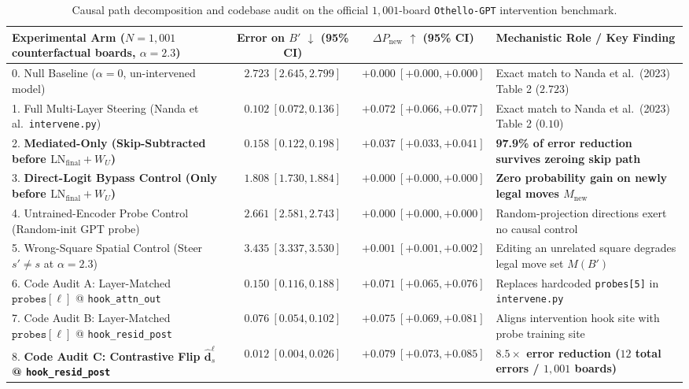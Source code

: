 \documentclass{article}
\begin{document}
\begin{table}[h!]
\caption{\label{tab:main_results}
Causal path decomposition and codebase audit on the official $1{,}001$-board \texttt{Othello-GPT} intervention benchmark.}
\centering
\scriptsize
\setlength{\tabcolsep}{4.0pt}
\renewcommand{\arraystretch}{1.02}
\begin{tabularx}{\textwidth}{@{}l cc X@{}}
\toprule
\textbf{Experimental Arm ($N = 1{,}001$ counterfactual boards, $\alpha = 2.3$)} & \textbf{Error on $B'$ $\downarrow$ (95\% CI)} & \textbf{$\Delta P_{\text{new}}$ $\uparrow$ (95\% CI)} & \textbf{Mechanistic Role / Key Finding} \\
\midrule
0. Null Baseline ($\alpha = 0$, un-intervened model) & $2.723\ [2.645, 2.799]$ & $+0.000\ [+0.000, +0.000]$ & Exact match to Nanda et al.\ (2023) Table 2 ($2.723$) \\
1. Full Multi-Layer Steering (Nanda et al.\ \texttt{intervene.py}) & $0.102\ [0.072, 0.136]$ & $+0.072\ [+0.066, +0.077]$ & Exact match to Nanda et al.\ (2023) Table 2 ($0.10$) \\
2. \textbf{Mediated-Only (Skip-Subtracted before $\text{LN}_{\text{final}} + W_U$)} & $\mathbf{0.158}\ [0.122, 0.198]$ & $\mathbf{+0.037}\ [+0.033, +0.041]$ & \textbf{97.9\% of error reduction survives zeroing skip path} \\
3. \textbf{Direct-Logit Bypass Control (Only before $\text{LN}_{\text{final}} + W_U$)} & $1.808\ [1.730, 1.884]$ & $\mathbf{+0.000}\ [+0.000, +0.000]$ & \textbf{Zero probability gain on newly legal moves $M_{\text{new}}$} \\
4. Untrained-Encoder Probe Control (Random-init GPT probe) & $2.661\ [2.581, 2.743]$ & $+0.000\ [+0.000, +0.000]$ & Random-projection directions exert no causal control \\
5. Wrong-Square Spatial Control (Steer $s' \neq s$ at $\alpha = 2.3$) & $3.435\ [3.337, 3.530]$ & $+0.001\ [+0.001, +0.002]$ & Editing an unrelated square degrades legal move set $M(B')$ \\
\midrule
6. Code Audit A: Layer-Matched $\texttt{probes}[\ell]$ @ \texttt{hook\_attn\_out} & $0.150\ [0.116, 0.188]$ & $+0.071\ [+0.065, +0.076]$ & Replaces hardcoded \texttt{probes[5]} in \texttt{intervene.py} \\
7. Code Audit B: Layer-Matched $\texttt{probes}[\ell]$ @ \texttt{hook\_resid\_post} & $0.076\ [0.054, 0.102]$ & $+0.075\ [+0.069, +0.081]$ & Aligns intervention hook site with probe training site \\
8. \textbf{Code Audit C: Contrastive Flip $\hat{\mathbf{d}}_s^\ell$ @ \texttt{hook\_resid\_post}} & $\mathbf{0.012}\ [0.004, 0.026]$ & $\mathbf{+0.079}\ [+0.073, +0.085]$ & \textbf{$8.5\times$ error reduction ($12$ total errors / $1{,}001$ boards)} \\
\bottomrule
\end{tabularx}
\end{table}
\end{document}

